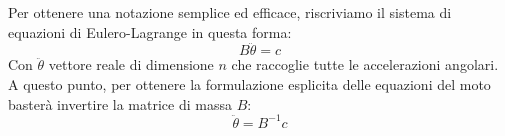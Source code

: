 \documentclass[12pt, a4paper] {article}
\begin{document}
Per ottenere una notazione semplice ed efficace, riscriviamo il sistema di equazioni di Eulero-Lagrange in questa forma:
\[B\ddot\theta=c\]
Con $\ddot\theta$ vettore reale di dimensione $n$ che raccoglie tutte le accelerazioni angolari.
A questo punto, per ottenere la formulazione esplicita delle equazioni del moto basterà invertire la matrice di massa $B$:
\[\ddot\theta=B^{-1}c\]
\end{document}
